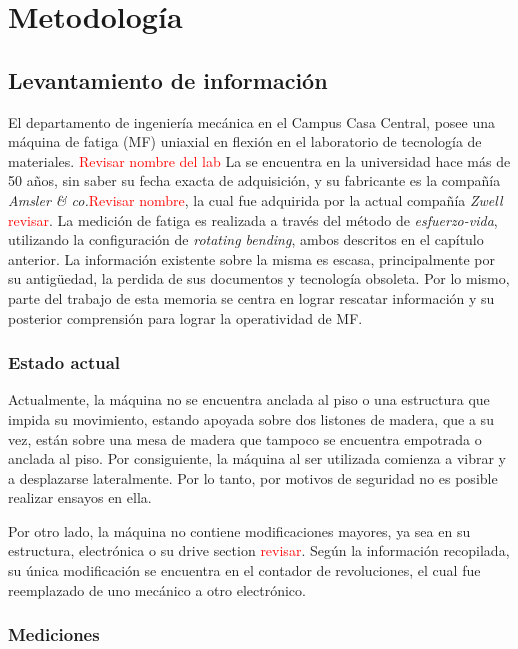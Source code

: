 \chapter{Metodología}
\section{Levantamiento de información}
El departamento de ingeniería mecánica en el Campus Casa Central, posee una máquina de fatiga (MF) uniaxial en flexión en el laboratorio de tecnología de materiales. \textcolor{red}{Revisar nombre del lab} La se encuentra en la universidad hace más de 50 años, sin saber su fecha exacta de adquisición, y su fabricante es la compañía \textit{Amsler \& co.}\textcolor{red}{Revisar nombre}, la cual fue adquirida por la actual compañía \textit{Zwell} \textcolor{red}{revisar}. La medición de fatiga es realizada a través del método de \textit{esfuerzo-vida}, utilizando la configuración de \textit{rotating bending}, ambos descritos en el capítulo anterior. La información existente sobre la misma es escasa, principalmente por su antigüedad, la perdida de sus documentos y tecnología obsoleta. Por lo mismo, parte del trabajo de esta memoria se centra en lograr rescatar información y su posterior comprensión para lograr la operatividad de MF.

\subsection{Estado actual}
Actualmente, la máquina no se encuentra anclada al piso o una estructura que impida su movimiento, estando apoyada sobre dos listones de madera, que a su vez, están sobre una mesa de madera que tampoco se encuentra empotrada o anclada al piso. Por consiguiente, la máquina al ser utilizada comienza a vibrar y a desplazarse lateralmente. Por lo tanto, por motivos de seguridad no es posible realizar ensayos en ella. 

Por otro lado, la máquina no contiene modificaciones mayores, ya sea en su estructura, electrónica o su drive section \textcolor{red}{revisar}. Según la información recopilada, su única modificación se encuentra en el contador de revoluciones, el cual fue reemplazado de uno mecánico a otro electrónico. 


\subsection{Mediciones}

